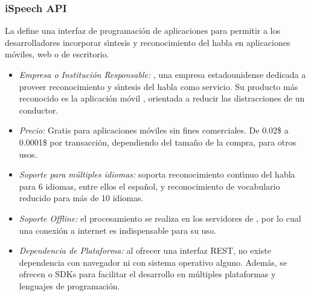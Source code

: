 \subsubsection{iSpeech API}
\label{sec:ispeech}

La  \cite{iSpeech} define una interfaz de programaci\'on de aplicaciones para permitir
a los desarrolladores incorporar s{\'\i}ntesis y reconocimiento del habla en aplicaciones m\'oviles,
web o de escritorio.

\begin{itemize}
	\item \emph{Empresa o Instituci\'on Responsable:} , una empresa estadounidense dedicada a
	proveer reconocimiento y s{\'\i}ntesis del habla como servicio. Su producto m\'as reconocido es la aplicaci\'on m\'ovil
	, orientada a reducir las distracciones de un conductor.
	\item \emph{Precio:} Gratis para aplicaciones m\'oviles sin fines comerciales. De 0.02\$ a 0.0001\$ por
	transacci\'on, dependiendo del tama\~no de la compra, para otros usos.
	\item \emph{Soporte para m\'ultiples idiomas:} soporta reconocimiento cont{\'\i}nuo del habla para 6 idiomas,
	entre ellos el espa\~nol, y reconocimiento de vocabulario reducido para m\'as de 10 idiomas.
	\item \emph{Soporte Offline:} el procesamiento se realiza en los servidores de , por lo cual
	una conexi\'on a internet es indispensable para su uso.
	\item \emph{Dependencia de Plataforma:} al ofrecer una interfaz REST, no existe dependencia con navegador
	ni con sistema operativo alguno. Adem\'as, se ofrecen  o SDKs para facilitar
	el desarrollo en m\'ultiples plataformas y lenguajes de programaci\'on.
\end{itemize}